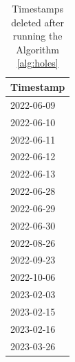 \begin{minipage}[t]{0.30\linewidth}
	\begin{table}[H]
		\centering
		\begin{tabular}[c]{l}
			\multicolumn{1}{c}{\textbf{Timestamp}} \\
			\hline
			2022-06-09                             \\
			2022-06-10                             \\
			2022-06-11                             \\
			2022-06-12                             \\
			2022-06-13                             \\
			2022-06-28                             \\
			2022-06-29                             \\
			2022-06-30                             \\
			2022-08-26                             \\
			2022-09-23                             \\
			2022-10-06                             \\
			2023-02-03                             \\
			2023-02-15                             \\
			2023-02-16                             \\
			2023-03-26                             \\
		\end{tabular}
		\caption{Timestamps deleted after running the Algorithm \ref{alg:holes}}
	\end{table}
\end{minipage}


